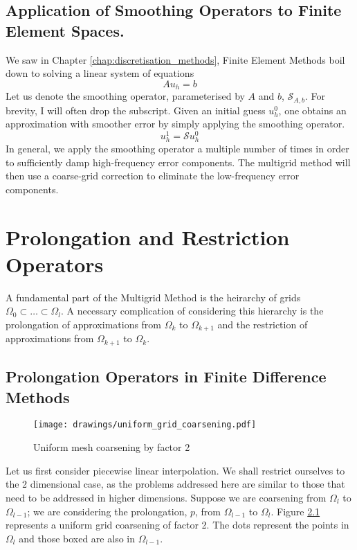 \documentclass[a4paper,10pt,oneside]{book}
\theoremstyle{plain}%
\theoremstyle{definition}
\theoremstyle{remark}
\newcommand{\calS}{\mathcal{S}}
\begin{document}
\section{Application of Smoothing Operators to Finite Element Spaces.}
We saw in Chapter \ref{chap:discretisation_methods}, Finite Element Methods
boil down to solving a linear system of equations
\begin{equation}
 Au_h=b
\end{equation}
Let us denote the smoothing operator, parameterised by $A$ and $b$,
$\calS_{A,b}$. For brevity, I will often drop the subscript. Given an initial
guess $u_h^0$, one obtains an approximation with smoother error by simply
applying the smoothing operator.
\begin{equation}
 u_h^1=\calS u_h^0
\end{equation}
In general, we apply the smoothing operator a multiple number of times in order
to sufficiently damp high-frequency error components. The multigrid method will
then use a coarse-grid correction to eliminate the low-frequency error
components.

\chapter{Prolongation and Restriction Operators}
A fundamental part of the Multigrid Method is the heirarchy of grids
$\Omega_0\subset\dots\subset\Omega_l$. A necessary complication of considering
this hierarchy is the prolongation of approximations from $\Omega_k$ to
$\Omega_{k+1}$ and the restriction of approximations from $\Omega_{k+1}$ to
$\Omega_k$.

\section{Prolongation Operators in Finite Difference Methods}
\begin{figure}
 \centering
 \texttt{[image: drawings/uniform\_grid\_coarsening.pdf]}
 \caption{Uniform mesh coarsening by factor 2}
 \label{fig:uniform_grid_coarsening}
\end{figure}

Let us first consider piecewise linear interpolation. We shall restrict
ourselves to the 2 dimensional case, as the problems addressed here are similar
to those that need to be addressed in higher dimensions. Suppose we are
coarsening from $\Omega_l$ to $\Omega_{l-1}$; we are considering the
prolongation, $p$, from $\Omega_{l-1}$ to $\Omega_l$. Figure
\ref{fig:uniform_grid_coarsening} represents a uniform grid coarsening of
factor 2. The dots represent the points in $\Omega_l$ and
those boxed are also in $\Omega_{l-1}$.
\end{document}
